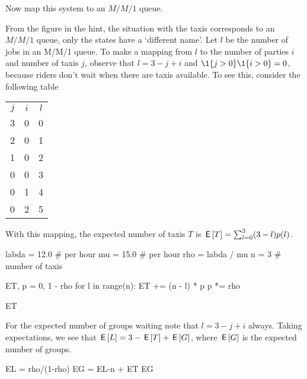 \begin{exercise}[Hall 5.22]
\begin{hint}
\begin{center}
 \end{center}
Now map this system to an $M/M/1$ queue. 
\end{hint}
\begin{solution}
  From the figure in the hint, the situation with the taxis corresponds to an $M/M/1$ queue, only the states have a `different name'.
  Let $l$ be the number of jobs in an M/M/1 queue.
  To make a mapping from $l$ to the number of parties $i$ and number of taxis $j$, observe that $l = 3 - j +i$ and $\1{j>0}\1{i>0} = 0$, because riders don't wait when there are taxis available. To see this,  consider the following table
\begin{center}
\begin{tabular}{ccc}
$j$ & $i$ & $l$\\
3& 0 & 0\\
2 & 0& 1\\
1 & 0& 2\\
0& 0& 3\\
0& 1& 4\\
0& 2& 5\\
\end{tabular}
\end{center}

With this mapping, the expected number of taxis $T$ is $\,\mathsf{E}\left[T\right] =  \sum_{l=0}^3 (3-l)p(l)$.
\begin{pyconsole}
labda = 12.0  # per hour
mu = 15.0  # per hour
rho = labda / mu
n = 3  # number of taxis

ET, p = 0, 1 - rho
for l in range(n):
    ET += (n - l) * p
    p *= rho

ET
\end{pyconsole}
For the expected number of groups waiting note that $l=3-j+i$ always.
Taking expectations, we see that $\,\mathsf{E}\left[L\right] = 3 - \,\mathsf{E}\left[T\right] + \,\mathsf{E}\left[G\right]$, where $\,\mathsf{E}\left[G\right]$ is the expected number of groups.
\begin{pyconsole}
EL = rho/(1-rho)
EG = EL-n + ET
EG
\end{pyconsole}


\end{solution}
\end{exercise}
